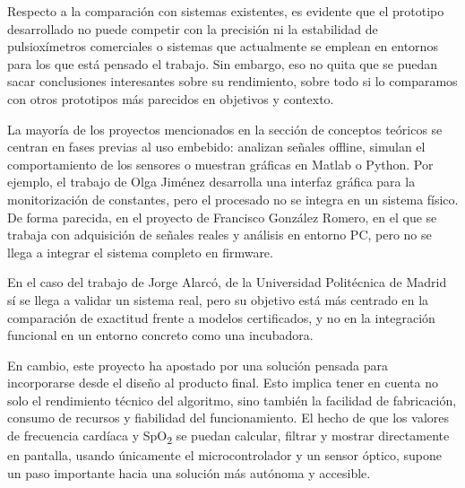 Respecto a la comparación con sistemas existentes, es evidente que el prototipo desarrollado no puede competir con la precisión ni la estabilidad de pulsioxímetros comerciales o sistemas que actualmente se emplean en entornos para los que está pensado el trabajo. Sin embargo, eso no quita que se puedan sacar conclusiones interesantes sobre su rendimiento, sobre todo si lo comparamos con otros prototipos más parecidos en objetivos y contexto.

La mayoría de los proyectos mencionados en la sección de conceptos teóricos se centran en fases previas al uso embebido: analizan señales offline, simulan el comportamiento de los sensores o muestran gráficas en Matlab o Python. Por ejemplo, el trabajo de Olga Jiménez\cite{jimenez2019pulsioximetro} desarrolla una interfaz gráfica para la monitorización de constantes, pero el procesado no se integra en un sistema físico. De forma parecida, en el proyecto de Francisco González Romero\cite{gonzalez2019pulsioximetro}, en el que se trabaja con adquisición de señales reales y análisis en entorno PC, pero no se llega a integrar el sistema completo en firmware.

En el caso del trabajo de Jorge Alarcó, de la Universidad Politécnica de Madrid \cite{Alarco2015} sí se llega a validar un sistema real, pero su objetivo está más centrado en la comparación de exactitud frente a modelos certificados, y no en la integración funcional en un entorno concreto como una incubadora.

En cambio, este proyecto ha apostado por una solución pensada para incorporarse desde el diseño al producto final. Esto implica tener en cuenta no solo el rendimiento técnico del algoritmo, sino también la facilidad de fabricación, consumo de recursos y fiabilidad del funcionamiento. El hecho de que los valores de frecuencia cardíaca y SpO\textsubscript{2} se puedan calcular, filtrar y mostrar directamente en pantalla, usando únicamente el microcontrolador y un sensor óptico, supone un paso importante hacia una solución más autónoma y accesible.


